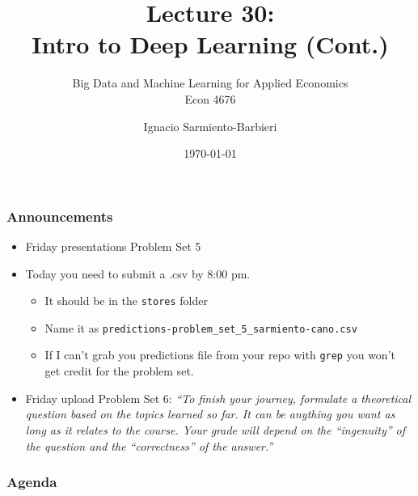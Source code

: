 \documentclass[
  shownotes,
  xcolor={svgnames},
  hyperref={colorlinks,citecolor=DarkBlue,linkcolor=DarkRed,urlcolor=DarkBlue}
  , aspectratio=169]{beamer}
\begin{document}
\title[Lecture 30]{Lecture 30: \\  Intro to Deep Learning (Cont.) }
\subtitle{Big Data and Machine Learning for Applied Economics \\ Econ 4676}
\date{\today}

\author[Sarmiento-Barbieri]{Ignacio Sarmiento-Barbieri}


\begin{frame}[noframenumbering]
\maketitle
\end{frame}





\begin{frame}
\frametitle{Announcements }

\begin{itemize}
\item Friday presentations Problem Set 5 
\medskip
\item Today you need to submit a .csv by 8:00 pm. 
  \begin{itemize}
    \item It should be in the \texttt{stores} folder
    \medskip
    \item Name it as \texttt{predictions-problem\_set\_5\_sarmiento-cano.csv}
    \medskip
    \item If I can't grab you predictions file from your repo with  \texttt{grep} you won't get credit for the problem set.
    \medskip 
  \end{itemize}
  \item Friday upload Problem Set 6: {\it ``To finish your journey,  formulate a theoretical question based on the topics learned so far. It can be anything you want as long as it relates to the course. Your grade will depend on the ``ingenuity'' of the question and the ``correctness'' of the answer.''}
\end{itemize}

\end{frame}


\begin{frame}
\frametitle{Agenda}

\tableofcontents

\end{frame}
\end{document}
